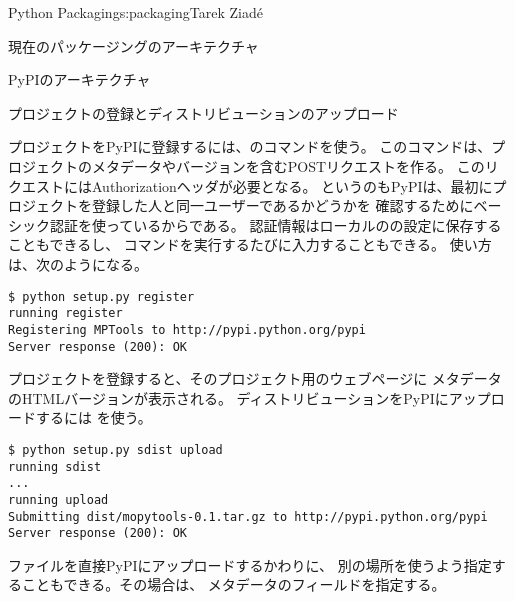 \begin{aosachapter}{Python Packaging}{s:packaging}{Tarek Ziad\'{e}}
\begin{aosasect1}{現在のパッケージングのアーキテクチャ}
\begin{aosasect2}{PyPIのアーキテクチャ}
\begin{aosasect3}{プロジェクトの登録とディストリビューションのアップロード}

プロジェクトをPyPIに登録するには、のコマンドを使う。
このコマンドは、プロジェクトのメタデータやバージョンを含むPOSTリクエストを作る。
このリクエストにはAuthorizationヘッダが必要となる。
というのもPyPIは、最初にプロジェクトを登録した人と同一ユーザーであるかどうかを
確認するためにベーシック認証を使っているからである。
認証情報はローカルのの設定に保存することもできるし、
コマンドを実行するたびに入力することもできる。
使い方は、次のようになる。

\begin{verbatim}
$ python setup.py register
running register
Registering MPTools to http://pypi.python.org/pypi
Server response (200): OK
\end{verbatim}

\noindent
プロジェクトを登録すると、そのプロジェクト用のウェブページに
メタデータのHTMLバージョンが表示される。
ディストリビューションをPyPIにアップロードするには
を使う。

\begin{verbatim}
$ python setup.py sdist upload
running sdist
...
running upload
Submitting dist/mopytools-0.1.tar.gz to http://pypi.python.org/pypi
Server response (200): OK
\end{verbatim}

ファイルを直接PyPIにアップロードするかわりに、
別の場所を使うよう指定することもできる。その場合は、
メタデータのフィールドを指定する。


\end{aosasect3}
\end{aosasect2}
\end{aosasect1}
\end{aosachapter}
